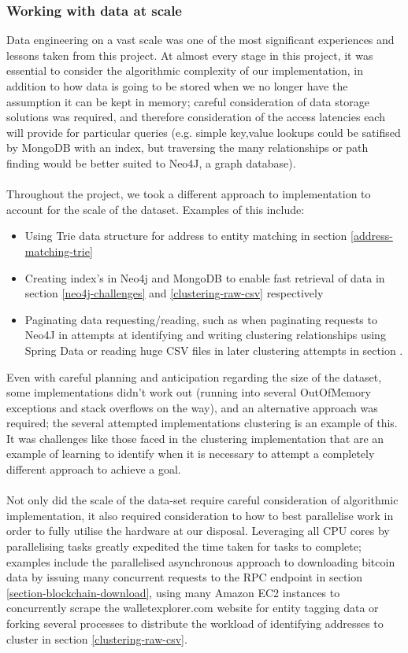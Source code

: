 \subsubsection{Working with data at scale}
Data engineering on a vast scale was one of the most significant experiences and lessons taken from this project. At almost every stage in this project, it was essential to consider the algorithmic complexity of our implementation, in addition to how data is going to be stored when we no longer have the assumption it can be kept in memory; careful consideration of data storage solutions was required, and therefore consideration of the access latencies each will provide for particular queries (e.g. simple key,value lookups could be satifised by MongoDB with an index, but traversing the many relationships or path finding would be better suited to Neo4J, a graph database). 
\\\\
Throughout the project, we took a different approach to implementation to account for the scale of the dataset. Examples of this include:
\begin{itemize}
    \item Using Trie data structure for address to entity matching in section \ref{address-matching-trie}
    \item Creating index's in Neo4j and MongoDB to enable fast retrieval of data in section \ref{neo4j-challenges} and \ref{clustering-raw-csv} respectively
    \item Paginating data requesting/reading, such as when paginating requests to Neo4J in attempts at identifying and writing clustering relationships using Spring Data or reading huge CSV files in later clustering attempts in section \label{section-clustering}. 
\end{itemize}

Even with careful planning and anticipation regarding the size of the dataset, some implementations didn't work out (running into several OutOfMemory exceptions and stack overflows on the way), and an alternative approach was required; the several attempted implementations clustering is an example of this. It was challenges like those faced in the clustering implementation that are an example of learning to identify when it is necessary to attempt a completely different approach to achieve a goal. 
\\\\
Not only did the scale of the data-set require careful consideration of algorithmic implementation, it also required consideration to how to best parallelise work in order to fully utilise the hardware at our disposal. 
Leveraging all CPU cores by parallelising tasks greatly expedited the time taken for tasks to complete; examples include the parallelised asynchronous approach to downloading bitcoin data by issuing many concurrent requests to the RPC endpoint in section \ref{section-blockchain-download}, using many Amazon EC2 instances to concurrently scrape the walletexplorer.com website for entity tagging data or forking several processes to distribute the workload of identifying addresses to cluster in section \ref{clustering-raw-csv}.


